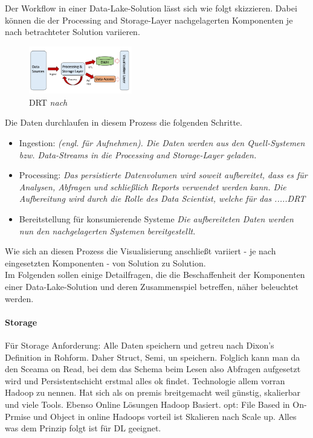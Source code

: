 \documentclass[twoside,twocolumn]{article}
\begin{document}
Der Workflow in einer Data-Lake-Solution lässt sich wie folgt skizzieren. Dabei können die der Processing and Storage-Layer nachgelagerten Komponenten je nach betrachteter Solution variieren.

\begin{figure}[h]
	\centering 
	\includegraphics[width=0.4\textwidth]{img/p4} 
	\caption{DRT \textit{nach} \cite{src9}}	
\end{figure}

Die Daten durchlaufen in diesem Prozess die folgenden Schritte.
\begin{itemize}
	\item Ingestion: \textit{(engl. für Aufnehmen). Die Daten werden aus den Quell-Systemen bzw. Data-Streams in die Processing and Storage-Layer geladen.}
	\item Processing: \textit{Das persistierte Datenvolumen wird soweit aufbereitet, dass es für Analysen, Abfragen und schließlich Reports verwendet werden kann. Die Aufbereitung wird durch die Rolle des Data Scientist, welche für das .....DRT \cite{src8}} 
	\item Bereitstellung für konsumierende Systeme \textit{Die aufbereiteten Daten werden nun den nachgelagerten Systemen bereitgestellt.}
\end{itemize}
Wie sich an diesen Prozess die Visualisierung anschließt variiert - je nach eingesetzten Komponenten - von Solution zu Solution.\\

Im Folgenden sollen einige Detailfragen, die die Beschaffenheit der Komponenten einer Data-Lake-Solution und deren Zusammenspiel betreffen, näher beleuchtet werden.

\paragraph{Storage}
		Für Storage Anforderung: Alle Daten speichern und getreu nach Dixon's Definition in Rohform. Daher Struct, Semi, un speichern. Folglich kann man da den Sceama on Read, bei dem das Schema beim Lesen also Abfragen aufgesetzt wird und Persistentschicht erstmal alles ok findet. Technologie allem vorran Hadoop zu nennen. Hat sich als on premis breitgemacht weil günstig, skalierbar und viele Tools. Ebenso Online Lösungen Hadoop Basiert. opt: File Based in On-Prmise und Object in online 
		Hadoops vorteil ist Skalieren nach Scale up. Alles was dem Prinzip folgt ist für DL geeignet.
		\cite{src8}
\end{document}
